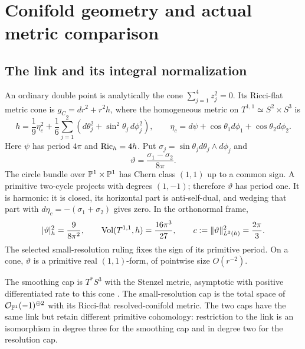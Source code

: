 \section{Conifold geometry and actual metric comparison}\label{sec:geometry}

\subsection{The link and its integral normalization}
An ordinary double point is analytically the cone $\sum_{j=1}^4z_j^2=0$.
Its Ricci-flat metric cone is $g_C=dr^2+r^2h$, where the homogeneous
metric on $T^{1,1}\simeq S^2\times S^3$ is
\begin{equation}\label{eq:link-metric}
 h=\frac19\eta_c^2+
 \frac16\sum_{j=1}^2(d\theta_j^2+\sin^2\theta_j\,d\phi_j^2),\qquad
 \eta_c=d\psi+\cos\theta_1d\phi_1+\cos\theta_2d\phi_2.
\end{equation}
Here $\psi$ has period $4\pi$ and $\operatorname{Ric}_h=4h$.
Put $\sigma_j=\sin\theta_jd\theta_j\wedge d\phi_j$ and
\begin{equation}\label{eq:link-form}
 \vartheta=\frac{\sigma_1-\sigma_2}{8\pi}.
\end{equation}
The circle bundle over $\mathbb P^1\times\mathbb P^1$ has Chern class $(1,1)$ up
to a common sign. A primitive two-cycle projects with degrees $(1,-1)$;
therefore $\vartheta$ has period one. It is harmonic: it is closed,
its horizontal part is anti-self-dual, and wedging that part with
$d\eta_c=-(\sigma_1+\sigma_2)$ gives zero. In the orthonormal frame,
\begin{equation}\label{eq:link-norm}
 |\vartheta|_h^2=\frac9{8\pi^2},\qquad
 \operatorname{Vol}(T^{1,1},h)=\frac{16\pi^3}{27},\qquad
 c:=\|\vartheta\|_{L^2(h)}^2=\frac{2\pi}{3}.
\end{equation}
The selected small-resolution ruling fixes the sign of its primitive
period. On a cone, $\vartheta$ is a primitive real $(1,1)$-form, of
pointwise size $O(r^{-2})$.

The smoothing cap is $T^*S^3$ with the Stenzel metric, asymptotic with
positive differentiated rate to this cone \cite{stenzel,candelas-ossa}.
The small-resolution cap is the total space of
$\mathcal O_{\mathbb P^1}(-1)^{\oplus2}$ with its Ricci-flat resolved-conifold metric.
The two caps have the same link but retain different primitive cohomology:
restriction to the link is an isomorphism in degree three for the smoothing
cap and in degree two for the resolution cap.

